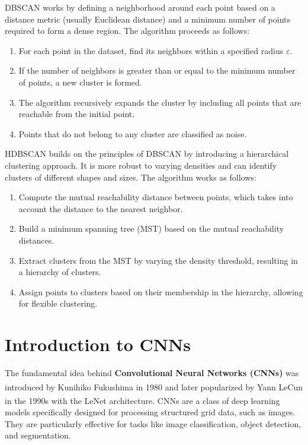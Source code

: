 \label{subsubsec:dbscan}

DBSCAN works by defining a neighborhood around each point based on a distance metric (usually Euclidean distance) and a
minimum number of points required to form a dense region. The algorithm proceeds as follows:

\begin{enumerate}
	\item For each point in the dataset, find its neighbors within a specified radius $\varepsilon$.
	\item If the number of neighbors is greater than or equal to the minimum number of points, a new cluster is formed.
	\item The algorithm recursively expands the cluster by including all points that are reachable from the initial point.
	\item Points that do not belong to any cluster are classified as noise.
\end{enumerate}

\label{subsubsec:hdbscan}

HDBSCAN builds on the principles of DBSCAN by introducing a hierarchical clustering approach. It is more robust to varying
densities and can identify clusters of different shapes and sizes. The algorithm works as follows:

\begin{enumerate}
	\item Compute the mutual reachability distance between points, which takes into account the distance to the nearest neighbor.
	\item Build a minimum spanning tree (MST) based on the mutual reachability distances.
	\item Extract clusters from the MST by varying the density threshold, resulting in a hierarchy of clusters.
	\item Assign points to clusters based on their membership in the hierarchy, allowing for flexible clustering.
\end{enumerate}

\section{Introduction to CNNs}
\label{sec:intro_cnn}

The fundamental idea behind \textbf{Convolutional Neural Networks (CNNs)} was introduced by Kunihiko Fukushima\textsuperscript{\cite{Fukushima-1987}}
in 1980 and later popularized by Yann LeCun in the 1990s with the LeNet architecture\textsuperscript{\cite{Lecun-et-al-1998}}. CNNs are a class of
deep learning models specifically designed for processing structured grid data, such as images. They are particularly effective for
tasks like image classification, object detection, and segmentation.

